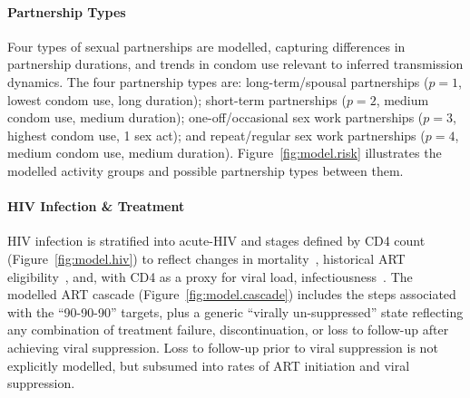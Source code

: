 \paragraph{Partnership Types}
Four types of sexual partnerships are modelled,
capturing differences in partnership durations, and
trends in condom use relevant to inferred transmission dynamics.
The four partnership types are:
long-term/spousal partnerships ($p=1$, lowest condom use, long duration);
short-term partnerships ($p=2$, medium condom use, medium duration);
one-off/occasional sex work partnerships ($p=3$, highest condom use, 1 sex act);
and repeat/regular sex work partnerships ($p=4$, medium condom use, medium duration).
Figure~\ref{fig:model.risk} illustrates
the modelled activity groups and possible partnership types between them.
\paragraph{HIV Infection \& Treatment}
HIV infection is stratified into
acute-HIV and stages defined by CD4 count (Figure~\ref{fig:model.hiv})
to reflect changes in mortality~\cite{Mangal2017},
historical ART eligibility~\cite{EswMOH2006gui,EswMOH2010gui,EswMOH2015gui,EswMOH2018gui},
and, with CD4 as a proxy for viral load, infectiousness~\cite{Boily2009}.
The modelled ART cascade (Figure~\ref{fig:model.cascade})
includes the steps associated with the ``90-90-90'' targets,
plus a generic ``virally un-suppressed'' state reflecting any combination of
treatment failure, discontinuation, or loss to follow-up after achieving viral suppression.
Loss to follow-up prior to viral suppression is not explicitly modelled,
but subsumed into rates of ART initiation and viral suppression.
